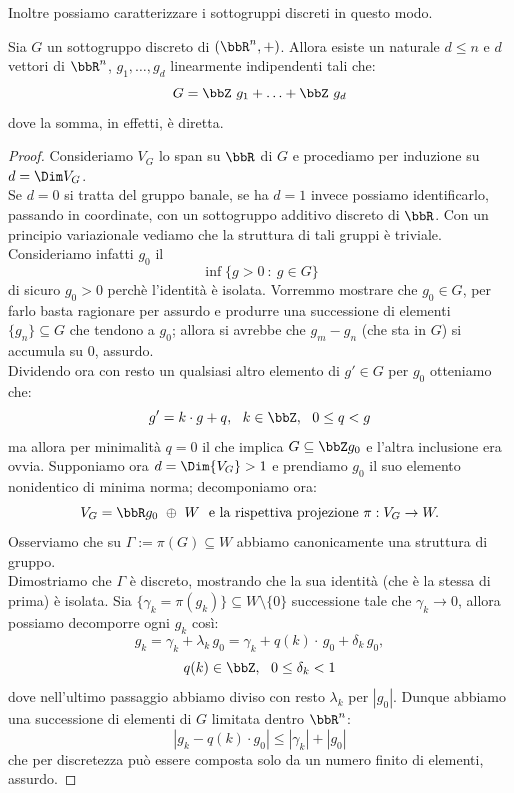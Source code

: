 Inoltre possiamo caratterizzare i sottogruppi discreti in questo modo.
\begin{teorema}\label{sgr_discreti}
    Sia $G$ un sottogruppo discreto di $(\bbR^n,+)$. Allora esiste un naturale $d\leq n$ e $d$ vettori di $\bbR^n$, $g_1,\ldots,g_d$ linearmente indipendenti tali che:
$$
G=\bbZ\ g_1+\ldots+\bbZ\ g_d
$$
dove la somma, in effetti, è diretta.
\end{teorema}
\begin{proof}
    Consideriamo $V_G$ lo span su $\bbR$ di $G$ e procediamo per induzione su $d=\Dim V_G$.\\
    Se $d=0$ si tratta del gruppo banale, se ha $d=1$ invece possiamo identificarlo, passando in coordinate, con un sottogruppo additivo discreto di $\bbR$. Con un principio variazionale vediamo che la struttura di tali gruppi è triviale. Consideriamo infatti $g_0$ il
    $$\inf\{g>0\ :\ g\in G\}$$
    di sicuro $g_0>0$ perchè l'identità è isolata. Vorremmo mostrare che $g_0\in G$, per farlo basta ragionare per assurdo e produrre una successione di elementi $\{g_n\}\subseteq G $ che tendono a $g_0$; allora si avrebbe che $g_m-g_n$ (che sta in $G$) si accumula su $0$, assurdo.\\
    Dividendo ora con resto un qualsiasi altro elemento di $g'\in G$ per $g_0$ otteniamo che:
    $$
    g'=k\cdot g+q,\ \ k\in \bbZ,\ \ 0\leq q <g
    $$
    ma allora per minimalità $q=0$ il che implica $G\subseteq \bbZ g_0$ e l'altra inclusione era ovvia.
    Supponiamo ora $d=\Dim{V_G}>1$ e prendiamo $g_0$ il suo elemento nonidentico di minima norma; decomponiamo ora:
    $$
    V_G=\bbR g_0\ \oplus\  W\ \mbox{ e la rispettiva projezione}\ \pi:V_G\rightarrow W.
    $$
    Osserviamo che su $\Gamma:=\pi(G)\subseteq W$ abbiamo canonicamente una struttura di gruppo.\\
    Dimostriamo che $\Gamma$ è discreto, mostrando che la sua identità (che è la stessa di prima) è isolata. Sia $\{\gamma_k=\pi(g_k)\}\subseteq W\setminus\{0\}$ successione tale che $\gamma_k\rightarrow 0$, allora possiamo decomporre ogni $g_k$ così:
    $$
    g_k=\gamma_k+\lambda_k\, g_0=\gamma_k+q(k)\cdot\, g_0+\delta_k\, g_0,
    $$
    $$
    q(k)\in\bbZ,\ \ 0\leq \delta_k<1
    $$
    dove nell'ultimo passaggio abbiamo diviso con resto $\lambda_k$ per $|g_0|$. Dunque abbiamo una successione di elementi di $G$ limitata dentro $\bbR^n$:
    $$
    |g_k-q(k)\cdot g_0| \leq |\gamma_k|+|g_0|
    $$
    che per discretezza può essere composta solo da un numero finito di elementi, assurdo.


\end{proof}
